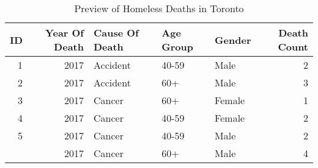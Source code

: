 \begin{table}

\caption{Preview of Homeless Deaths in Toronto}
\centering
\begin{tabular}[t]{rrlllr}
\toprule
ID & Year Of Death & Cause Of Death & Age Group & Gender & Death Count\\
\midrule
1 & 2017 & Accident & 40-59 & Male & 2\\
2 & 2017 & Accident & 60+ & Male & 3\\
3 & 2017 & Cancer & 60+ & Female & 1\\
4 & 2017 & Cancer & 40-59 & Female & 2\\
5 & 2017 & Cancer & 40-59 & Male & 2\\
\addlinespace
6 & 2017 & Cancer & 60+ & Male & 4\\
\bottomrule
\end{tabular}
\end{table}
